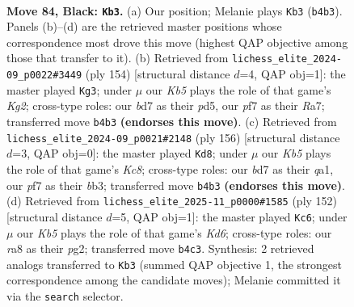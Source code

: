 \documentclass[11pt]{article}
\begin{document}
\clearpage

\begin{figure}[p]\centering
\begin{subfigure}{0.46\textwidth}\centering
\resizebox{\linewidth}{!}{%
\newchessgame
\chessboard[
  setfen={R7/3B1P2/8/7P/1k6/8/8/7K b - - 0 84},
  showmover=false,
  pgfstyle=straightmove, color=movearrow, markmove={b4-b3}
]}
\caption{}
\end{subfigure}\hfill
\begin{subfigure}{0.46\textwidth}\centering
\resizebox{\linewidth}{!}{%
\newchessgame
\chessboard[
  setfen={8/R7/8/3p4/8/3k4/6K1/2r5 w - - 41 78},
  showmover=false,
  pgfstyle=straightmove, color=movearrow, markmove={g2-g3}
]}
\caption{}
\end{subfigure}
\\[4pt]
\begin{subfigure}{0.46\textwidth}\centering
\resizebox{\linewidth}{!}{%
\newchessgame
\chessboard[
  setfen={2K5/8/2k5/8/5p1p/1b6/8/q7 w - - 0 79},
  showmover=false,
  pgfstyle=straightmove, color=movearrow, markmove={c8-d8}
]}
\caption{}
\end{subfigure}\hfill
\begin{subfigure}{0.46\textwidth}\centering
\resizebox{\linewidth}{!}{%
\newchessgame
\chessboard[
  setfen={8/8/1b1K4/1P6/5k2/8/6p1/8 w - - 0 77},
  showmover=false,
  pgfstyle=straightmove, color=movearrow, markmove={d6-c6}
]}
\caption{}
\end{subfigure}
\caption{\textbf{Move 84, Black: \texttt{Kb3}.} (a) Our position; Melanie plays \texttt{Kb3} (\texttt{b4b3}). Panels (b)--(d) are the retrieved master positions whose correspondence most drove this move (highest QAP objective among those that transfer to it). (b) Retrieved from \texttt{lichess\_elite\_2024-09\_p0022\#3449} (ply 154) [structural distance $d$=4, QAP obj=1]: the master played \texttt{Kg3}; under $\mu$ our \emph{Kb5} plays the role of that game's \emph{Kg2}; cross-type roles: our \emph{b}d7 as their \emph{p}d5, our \emph{p}f7 as their \emph{R}a7; transferred move \texttt{b4b3} \textbf{(endorses this move)}. (c) Retrieved from \texttt{lichess\_elite\_2024-09\_p0021\#2148} (ply 156) [structural distance $d$=3, QAP obj=0]: the master played \texttt{Kd8}; under $\mu$ our \emph{Kb5} plays the role of that game's \emph{Kc8}; cross-type roles: our \emph{b}d7 as their \emph{q}a1, our \emph{p}f7 as their \emph{b}b3; transferred move \texttt{b4b3} \textbf{(endorses this move)}. (d) Retrieved from \texttt{lichess\_elite\_2025-11\_p0000\#1585} (ply 152) [structural distance $d$=5, QAP obj=1]: the master played \texttt{Kc6}; under $\mu$ our \emph{Kb5} plays the role of that game's \emph{Kd6}; cross-type roles: our \emph{r}a8 as their \emph{p}g2; transferred move \texttt{b4c3}. Synthesis: 2 retrieved analogs transferred to \texttt{Kb3} (summed QAP objective 1, the strongest correspondence among the candidate moves); Melanie committed it via the \texttt{search} selector.}
\label{fig:thought-m167}
\end{figure}
\end{document}
